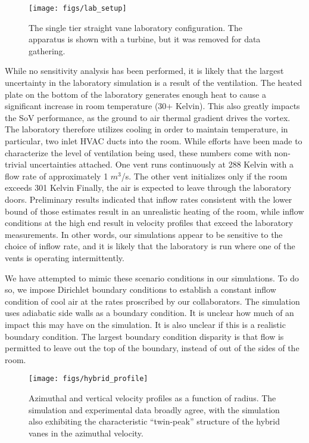   \begin{figure}[!htb]
    \begin{center}
     \texttt{[image: figs/lab\_setup]}
     \caption{The single tier straight vane laboratory configuration. The
     apparatus is shown with a turbine, but it was removed for data
     gathering.}
     \label{fig:lab}
    \end{center}
  \end{figure}

While no sensitivity analysis has been performed, it is likely that the
largest uncertainty in the laboratory simulation is a result of the
ventilation. The heated plate on the bottom of the laboratory
generates enough heat to cause a significant increase in room
temperature (30+ Kelvin). This also greatly impacts the SoV
performance, as the ground to air thermal gradient drives the
vortex. The laboratory therefore utilizes cooling in order to maintain
temperature, in particular, two inlet HVAC ducts into the room. While
efforts have been made to characterize the level of ventilation being
used, these numbers come with non-trivial uncertainties attached. One
vent runs continuously at 288 Kelvin with a flow rate of approximately 1 
$m^3$/s.
The other vent initializes only if the room exceeds 301 Kelvin
Finally, the air is expected to leave through the laboratory doors.
Preliminary results indicated that 
inflow rates consistent with the lower bound of those estimates result in an
unrealistic heating of the room, while inflow conditions at the high end
result in velocity profiles that exceed the laboratory measurements. In
other words, our simulations appear to be sensitive to the choice of
inflow rate, and it is likely that the laboratory is run where one of
the vents is operating intermittently. 

We have attempted to mimic these scenario conditions in our
simulations. To do so, we impose Dirichlet boundary conditions to
establish a constant inflow condition of cool air at the rates 
proscribed by our collaborators. The simulation uses adiabatic side
walls as a boundary condition. It is unclear how much of an impact this
may have on the simulation. It is also unclear if this is a realistic
boundary condition. The largest boundary condition disparity is that
flow is permitted to leave out the top of the boundary, instead of out
of the sides of the room. 

  \begin{figure}[!htb]
    \begin{center}
     \texttt{[image: figs/hybrid\_profile]}
     \caption{Azimuthal and vertical velocity profiles as a function of
     radius. The simulation and experimental data broadly agree, with
     the simulation also exhibiting the characteristic ``twin-peak''
     structure of the hybrid vanes in the azimuthal velocity. }
     \label{fig:lab}
    \end{center}
  \end{figure}

